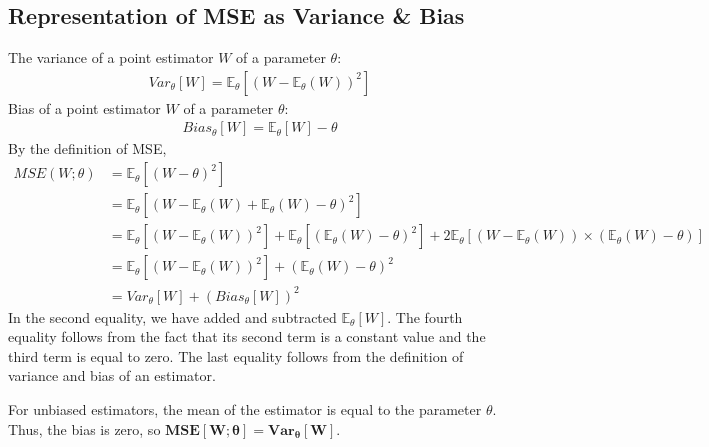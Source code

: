 \documentclass[12pt]{report}
\begin{document}
\subsection{Representation of MSE as Variance \& Bias}
The variance of a point estimator $W$ of a parameter $\theta$:
\begin{align*}
Var_\theta[W]  = \mathbb{E}_\theta[(W - \mathbb{E}_\theta(W))^2]
\end{align*} 
Bias of a point estimator $W$ of a parameter $\theta$: 
\begin{align*}
Bias_\theta[W] = \mathbb{E}_\theta[W] - \theta
\end{align*}
By the definition of MSE,
\begin{align*}
MSE(W ; \theta) &= \mathbb{E}_\theta[(W - \theta)^2]\\
&= \mathbb{E}_\theta[(W - \mathbb{E}_\theta(W) + \mathbb{E}_\theta(W) - \theta)^2]\\
&= \mathbb{E}_\theta[(W - \mathbb{E}_\theta(W))^2] + \mathbb{E}_\theta[(\mathbb{E}_\theta(W) - \theta)^2] + 2\mathbb{E}_\theta[(W - \mathbb{E}_\theta(W)) \times (\mathbb{E}_\theta(W) - \theta)] \\
&= \mathbb{E}_\theta[(W - \mathbb{E}_\theta(W))^2] + (\mathbb{E}_\theta(W) - \theta)^2\\
&= Var_\theta[W] + (Bias_\theta[W])^2
\end{align*} 
In the second equality, we have added and subtracted $\mathbb{E}_\theta[W]$. The fourth equality follows from the fact that its second term is a constant value and the third term is equal to zero. The last equality follows from the definition of variance and bias of an estimator.
\begin{note}
For unbiased estimators, the mean of the estimator is equal to the parameter $\theta$. Thus, the bias is zero, so $\bm{MSE[W;\theta] = Var_\theta[W]}$.
\end{note}
\end{document}
